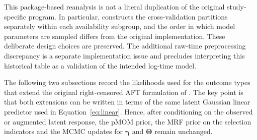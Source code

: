 This package-based reanalysis is not a literal duplication of the original
study-specific  program.  In particular, 
constructs the cross-validation partitions separately within each availability
subgroup, and the order in which model parameters are sampled differs from the
original  implementation. These deliberate design choices are preserved. The additional
raw-time preprocessing discrepancy is a separate implementation issue and
precludes interpreting this historical table as a validation of the intended
log-time model.

The following two subsections record the likelihoods used for the outcome types that
extend the original right-censored AFT formulation of \citet{chekouo2017}.  The
key point is that both extensions can be written in terms of the same latent
Gaussian linear predictor used in Equation~\ref{eq:linear}.  Hence, after
conditioning on the observed or augmented latent response, the pMOM prior, the
MRF prior on the selection indicators and the MCMC updates for
$\bm{\gamma}$ and $\bm{\Theta}$ remain unchanged.

